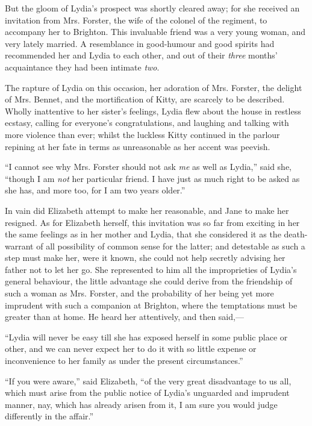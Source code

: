 \documentclass[12pt]{book}
\begin{document}
But the gloom of Lydia's prospect was shortly cleared away; for she received an invitation from Mrs. Forster, the wife of the colonel of the regiment, to accompany her to Brighton. This invaluable friend was a very young woman, and very lately married. A resemblance in good-humour and good spirits had recommended her and Lydia to each other, and out of their \textit{three} months' acquaintance they had been intimate \textit{two}.

The rapture of Lydia on this occasion, her adoration of Mrs. Forster, the delight of Mrs. Bennet, and the mortification of Kitty, are scarcely to be described. Wholly inattentive to her sister's feelings, Lydia flew about the house in restless ecstasy, calling for everyone's congratulations, and laughing and talking with more violence than ever; whilst the luckless Kitty continued in the parlour repining at her fate in terms as unreasonable as her accent was peevish.

``I cannot see why Mrs. Forster should not ask \textit{me} as well as Lydia,'' said she, ``though I am \textit{not} her particular friend. I have just as much right to be asked as she has, and more too, for I am two years older.''

In vain did Elizabeth attempt to make her reasonable, and Jane to make her resigned. As for Elizabeth herself, this invitation was so far from exciting in her the same feelings as in her mother and Lydia, that she considered it as the death-warrant of all possibility of common sense for the latter; and detestable as such a step must make her, were it known, she could not help secretly advising her father not to let her go. She represented to him all the improprieties of Lydia's general behaviour, the little advantage she could derive from the friendship of such a woman as Mrs. Forster, and the probability of her being yet more imprudent with such a companion at Brighton, where the temptations must be greater than at home. He heard her attentively, and then said,---

``Lydia will never be easy till she has exposed herself in some public place or other, and we can never expect her to do it with so little expense or inconvenience to her family as under the present circumstances.''

``If you were aware,'' said Elizabeth, ``of the very great disadvantage to us all, which must arise from the public notice of Lydia's unguarded and imprudent manner, nay, which has already arisen from it, I am sure you would judge differently in the affair.''
\end{document}
